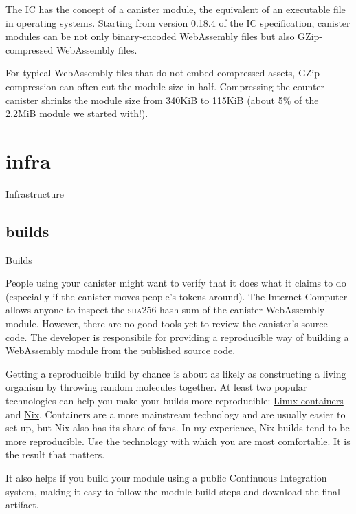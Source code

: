 \documentclass{article}
\begin{document}
The IC has the concept of a \href{https://internetcomputer.org/docs/current/references/ic-interface-spec/#ic-install_code}{canister module}, the equivalent of an executable file in operating systems.
  Starting from \href{https://internetcomputer.org/docs/current/references/ic-interface-spec/#0_18_4}{version 0.18.4} of the IC specification, canister modules can be not only binary-encoded WebAssembly files but also GZip-compressed WebAssembly files.

For typical WebAssembly files that do not embed compressed assets, GZip-compression can often cut the module size in half.
Compressing the counter canister shrinks the module size from 340KiB to 115KiB (about 5\% of the 2.2MiB module we started with!).

\section{infra}{Infrastructure}
\subsection{builds}{Builds}

People using your canister might want to verify that it does what it claims to do (especially if the canister moves people's tokens around).
The Internet Computer allows anyone to inspect the \textsc{sha256} hash sum of the canister WebAssembly module.
However, there are no good tools yet to review the canister's source code.
The developer is responsibile for providing a reproducible way of building a WebAssembly module from the published source code.


Getting a reproducible build by chance is about as likely as constructing a living organism by throwing random molecules together.
At least two popular technologies can help you make your builds more reproducible: \href{https://linuxcontainers.org/}{Linux containers} and \href{https://nixos.org/}{Nix}.
Containers are a more mainstream technology and are usually easier to set up, but Nix also has its share of fans.
In my experience, Nix builds tend to be more reproducible.
Use the technology with which you are most comfortable.
It is the result that matters.

It also helps if you build your module using a public Continuous Integration system, making it easy to follow the module build steps and download the final artifact.
\end{document}
